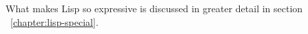 \documentclass[a4paper,10pt,twoside]{report}
\begin{document}
What makes Lisp so expressive is discussed in greater detail in section
~\ref{chapter:lisp-special}. 

\begin{comment}
  Paul Graham nicely listed 9 particularly important ideas: \cite{pg-lisp-diff}

  \begin{description}
  \item [Conditionals] A conditional is an if-then-else construct. We take these
    for granted now. They were invented by McCarthy in the course of developing
    Lisp. (Fortran at that time only had a conditional goto, closely based on
    the branch instruction in the underlying hardware.) McCarthy, who was on the
    Algol committee, got conditionals into Algol, whence they spread to most
    other languages.
  \item[A function type] In Lisp, functions are first class objects-- they're a
    data type just like integers, strings, etc, and have a literal
    representation, can be stored in variables, can be passed as arguments, and
    so on.
  \item[Recursion] Recursion existed as a mathematical concept before Lisp of
    course, but Lisp was the first programming language to support it. (It's
    arguably implicit in making functions first class objects.)
  \item[A new concept of variables] In Lisp, all variables are effectively
    pointers. Values are what have types, not variables, and assigning or
    binding variables means copying pointers, not what they point to.
  \item[Garbage Collection]
  \item[Programs composed of expressions] Lisp programs are trees of
    expressions, each of which returns a value. (In some Lisps expressions can
    return multiple values.) This is in contrast to Fortran and most succeeding
    languages, which distinguish between expressions and statements.

    It was natural to have this distinction in Fortran because (not surprisingly
    in a language where the input format was punched cards) the language was
    line-oriented. You could not nest statements. And so while you needed
    expressions for math to work, there was no point in making anything else
    return a value, because there could not be anything waiting for it.

    This limitation went away with the arrival of block-structured languages,
    but by then it was too late. The distinction between expressions and
    statements was entrenched. It spread from Fortran into Algol and thence to
    both their descendants.


\end{comment}
\end{document}
